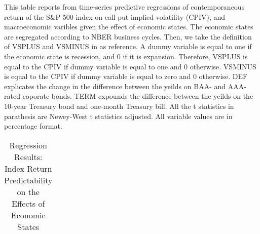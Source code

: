\begin{table}[h]

\caption{Regression Results: Index Return Predictability on the Effects of Economic States}\label{table:EcoStates}
\begin{threeparttable}

\medskip
\begin{spacing}{1.1}
{\scriptsize  
This table reports from time-series predictive regressions of contemporaneous return of the S\&P 500 index on call-put implied volatility (CPIV), and macroeconomic varibles given the effect of economic states. The economic states are segregated according to NBER business cycles. Then, we take the definition of VSPLUS and VSMINUS in \textcite{atilgan2015implied} as reference. A dummy variable is equal to one if the economic state is recession, and 0 if it is expansion. Therefore, VSPLUS is equal to the CPIV if dummy variable is equal to one and 0 otherwise. VSMINUS is equal to the CPIV if dummy variable is equal to zero and 0 otherwise. DEF explicates the change in the difference between the yeilds on BAA- and AAA-rated coporate bonds. TERM expounds the difference between the yeilds on the 10-year Treasury bond and one-month Treasury bill. All the t statistics in parathesis are Newey-West t statistics adjusted. All variable values are in percentage format. 
}
\end{spacing}
\medskip
\medskip
\tiny
\centering
\begin{tabular}{ccccccccccccccc}
\toprule


\end{tabular}
\end{threeparttable}
\end{table}
